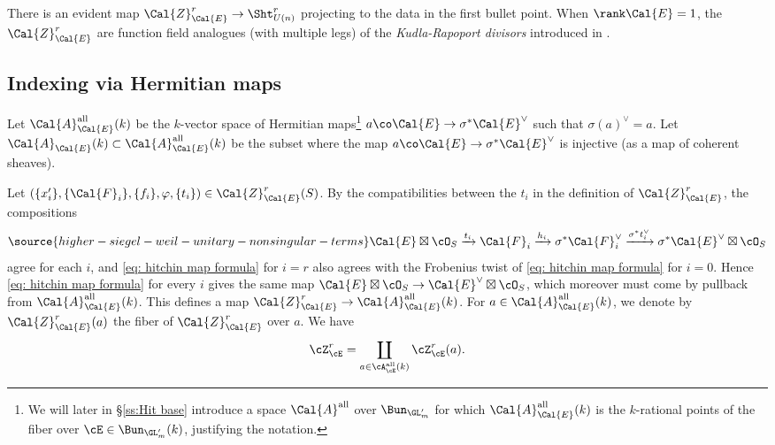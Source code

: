 There is an evident map $\Cal{Z}_{\Cal{E}}^{r} \rightarrow \Sht_{U(n)}^r$ projecting to the data in the first bullet point. When $\rank \Cal{E}=1$, the $\Cal{Z}_{\Cal{E}}^{r} $ are function field analogues (with multiple legs) of the \emph{Kudla-Rapoport divisors} introduced in \cite{KRI,KRII}. %



\subsection{Indexing via Hermitian maps}\label{ssec: sht index by a}
\begin{defn}
\notready\label{def: A(k)}Let $\Cal{A}^{\rm all}_{\Cal{E}}(k)$ be the $k$-vector space of Hermitian maps\footnote{We will later in \S\ref{ss:Hit base} introduce a space $\Cal{A}^{\rm all}$ over $\Bun_{\GL'_m}$ for which $\Cal{A}^{\rm all}_{\Cal{E}}(k)$ is the $k$-rational points of the fiber over $\cE\in \Bun_{\GL'_m}(k)$, justifying the notation.} $a \co \Cal{E} \rightarrow \sigma^* \Cal{E}^{\vee}$ such that $\sigma(a)^{\vee} =a$. Let $\Cal{A}_{\Cal{E}}(k)\subset \Cal{A}^{\rm all}_{\Cal{E}}(k)$ be the subset where the map $a \co \Cal{E} \rightarrow \sigma^* \Cal{E}^{\vee}$ is injective (as a map of coherent sheaves).
\end{defn}

Let $(\{x'_i\}, \{\Cal{F}_i\}, \{f_i\}, \varphi, \{t_i\}) \in \Cal{Z}_{\Cal{E}}^r(S)$. By the compatibilities between the $t_i$ in the definition of $\Cal{Z}_{\Cal{E}}^r$, the compositions
\begin{equation}\label{eq: hitchin map formula}
\source{higher-siegel-weil-unitary-nonsingular-terms}
\Cal{E} \boxtimes \cO_S \xrightarrow{t_i} \Cal{F}_i \xrightarrow{h_i} \sigma^* \Cal{F}_i^{\vee} \xrightarrow{\sigma^* t^{\vee}_{i}} \sigma^* \Cal{E}^{\vee} \boxtimes \cO_S
\end{equation}
agree for each $i$, and \eqref{eq: hitchin map formula} for $i=r$ also agrees with the Frobenius twist of \eqref{eq: hitchin map formula} for $i=0$. Hence \eqref{eq: hitchin map formula} for every $i$ gives the same map $\Cal{E} \boxtimes \cO_S  \rightarrow \Cal{E}^{\vee} \boxtimes \cO_S$, which moreover must come by pullback from $\Cal{A}^{\rm all}_{\Cal{E}}(k)$. This defines a map $\Cal{Z}_{\Cal{E}}^{r} \rightarrow \Cal{A}^{\rm all}_{\Cal{E}}(k)$. For $a \in \Cal{A}^{\rm all}_{\Cal{E}}(k)$, we denote by $\Cal{Z}^{r}_{\Cal{E}}(a)$ the fiber of $\Cal{Z}^{r}_{\Cal{E}}$ over $a$. We have
\begin{equation*}
\cZ_{\cE}^{r}=\coprod_{a\in \cA^{\rm all}_{\cE}(k)} \cZ^{r}_{\cE}(a).
\end{equation*}


